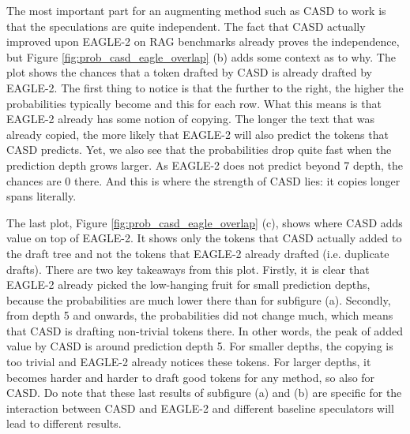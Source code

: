 The most important part for an augmenting method such as CASD to work is that the speculations are quite independent. The fact that CASD actually improved upon EAGLE-2 on RAG benchmarks already proves the independence, but Figure \ref{fig:prob_casd_eagle_overlap} (b) adds some context as to why. The plot shows the chances that a token drafted by CASD is already drafted by EAGLE-2. The first thing to notice is that the further to the right, the higher the probabilities typically become and this for each row. What this means is that EAGLE-2 already has some notion of copying. The longer the text that was already copied, the more likely that EAGLE-2 will also predict the tokens that CASD predicts. Yet, we also see that the probabilities drop quite fast when the prediction depth grows larger. As EAGLE-2 does not predict beyond 7 depth, the chances are 0 there. And this is where the strength of CASD lies: it copies longer spans literally.

The last plot, Figure \ref{fig:prob_casd_eagle_overlap} (c), shows where CASD adds value on top of EAGLE-2. It shows only the tokens that CASD actually added to the draft tree and not the tokens that EAGLE-2 already drafted (i.e. duplicate drafts). There are two key takeaways from this plot. Firstly, it is clear that EAGLE-2 already picked the low-hanging fruit for small prediction depths, because the probabilities are much lower there than for subfigure (a). Secondly, from depth 5 and onwards, the probabilities did not change much, which means that CASD is drafting non-trivial tokens there. In other words, the peak of added value by CASD is around prediction depth 5. For smaller depths, the copying is too trivial and EAGLE-2 already notices these tokens. For larger depths, it becomes harder and harder to draft good tokens for any method, so also for CASD. Do note that these last results of subfigure (a) and (b) are specific for the interaction between CASD and EAGLE-2 and different baseline speculators will lead to different results.

